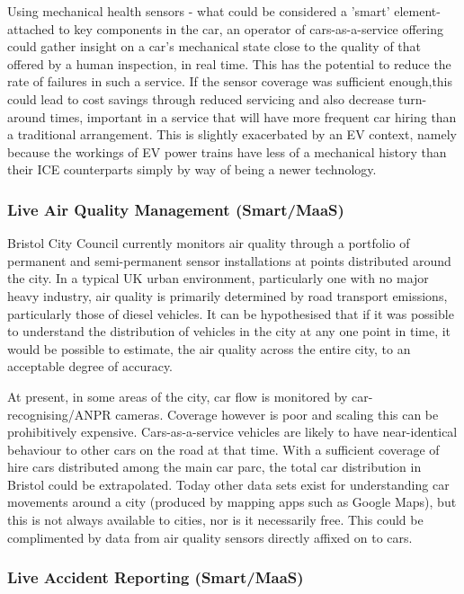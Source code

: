 \documentclass[journal]{IEEEtran}
\begin{document}
Using mechanical health sensors - what could be considered a 'smart' element- attached to key components in the car,
an operator of cars-as-a-service offering could gather insight on a
car's mechanical state close to the quality of that offered by a human
inspection, in real time. This has the potential to reduce the rate of
failures in such a service. If the sensor coverage was sufficient
enough,this could lead to cost savings through reduced servicing and
also decrease turn-around times, important in a service that will have
more frequent car hiring than a traditional arrangement. This is slightly exacerbated by an EV context, namely because the workings of EV power trains have less of a mechanical history than their ICE counterparts simply by way of being a newer technology. 

\subsubsection{Live Air Quality Management (Smart/MaaS)}

Bristol City Council currently monitors air quality through a
portfolio of permanent and semi-permanent sensor installations at
points distributed around the city. In a typical UK urban environment,
particularly one with no major heavy industry, air quality is primarily
determined by road transport emissions, particularly those of diesel
vehicles. It can be hypothesised that if it was possible to understand
the distribution of vehicles in the city at any one point in time, it
would be possible to estimate, the air quality across the entire city,
to an acceptable degree of accuracy.

At present, in some areas of the city, car flow is monitored by
car-recognising/ANPR cameras. Coverage however is poor and scaling
this can be prohibitively expensive. Cars-as-a-service vehicles are
likely to have near-identical behaviour to other cars on the road at
that time. With a sufficient coverage of hire cars distributed among
the main car parc, the total car distribution in Bristol could be
extrapolated. Today other data sets exist for understanding car
movements around a city (produced by mapping apps such as Google
Maps), but this is not always available to cities, nor is it
necessarily free. This could be complimented by data from air quality
sensors directly affixed on to cars. 



\subsubsection{Live Accident Reporting (Smart/MaaS)}
\end{document}
